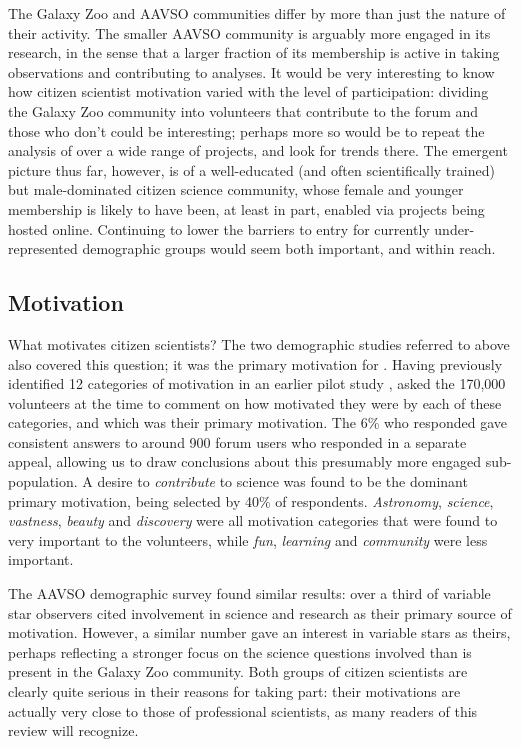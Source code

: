 \documentclass{ar2e}
\begin{document}
The Galaxy Zoo and AAVSO communities differ by more than just the nature of
their activity. The smaller AAVSO community is arguably more engaged in its
research, in the sense that a larger fraction of its membership is active in
taking observations and contributing to analyses. It would be very interesting
to know how citizen scientist motivation varied with the level of
participation: dividing the Galaxy Zoo community into volunteers that
contribute to the  forum and those who don't could be interesting; perhaps
more so would be to repeat the analysis of \citeauthor{Rad++2013} over a wide
range of projects, and look for trends there. The emergent picture thus far,
however, is of a well-educated (and often scientifically trained)  but
male-dominated citizen science community, whose female and younger membership
is likely to have been, at least in part, enabled via projects being hosted
online. Continuing to lower the barriers to entry for currently
under-represented demographic groups would seem both important, and within
reach.



\subsection{Motivation}
\label{sec:crowd:motivation}

What motivates citizen scientists? The two demographic studies referred to
above also covered this question; it was the primary motivation for
\citeauthor{Rad++2013}. Having previously identified 12 categories of
motivation in an earlier pilot study \citep{Rad++2010}, \citeauthor{Rad++2013}
asked the 170,000 volunteers at the time to comment on how motivated they were
by each of these categories, and which was their primary motivation. The 6\%
who responded gave consistent answers to around 900 forum users who responded
in a separate appeal, allowing us to draw conclusions about this presumably
more engaged sub-population. A desire to {\it contribute} to science was found
to be the dominant primary motivation, being selected by 40\% of respondents.
{\it Astronomy}, {\it science}, {\it vastness}, {\it beauty} and 
{\it discovery} were all motivation categories that were found to very
important to the volunteers, while {\it fun}, {\it learning} and {\it
community} were less important. 

The AAVSO demographic survey \citep{P+P2012} found similar results: over a
third of variable star observers cited involvement in science and research as
their primary source of motivation. However, a similar number gave an interest
in variable stars as theirs, perhaps reflecting a stronger focus on the
science questions involved than is present in the Galaxy Zoo community. Both
groups of citizen scientists are clearly quite serious in their reasons for
taking part: their motivations are actually very close to those of
professional scientists, as many readers of this review will recognize.
\end{document}
